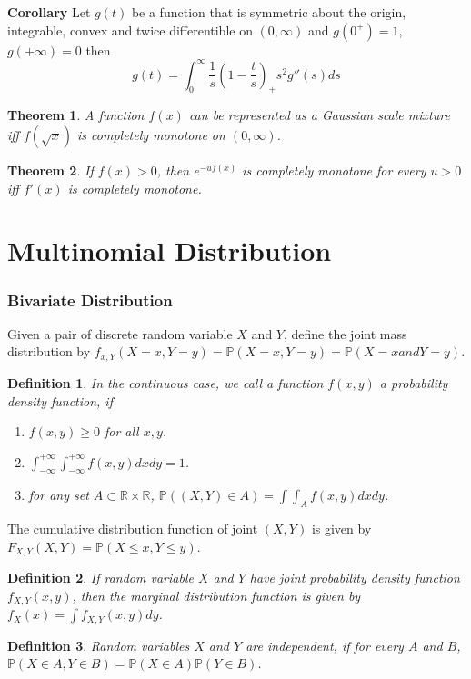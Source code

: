 \documentclass[11pt]{article}
\def\BP{{\bf P}}
\def\BR{{\mathbb R}}
\def\BP{{\mathbb P}}
\newtheorem{theorem}{Theorem}[section]
\newtheorem{definition}{Definition}[section]
\begin{document}
\textbf{Corollary}
Let $g(t)$ be a function that is symmetric about the origin, integrable, convex and twice differentible on $(0, \infty)$ and $g(0^+) = 1$, $g(+\infty) = 0$ then
\[ g(t) = \int_0^{\infty} \frac{1}{s} (1-\frac{t}{s})_+ s^2 g''(s) ds \]

\begin{theorem}
A function $f(x)$ can be represented as a Gaussian scale mixture iff $f(\sqrt{x})$ is completely monotone on $(0, \infty)$.
\end{theorem}

\begin{theorem}
If $f(x) > 0$, then $e^{-uf(x)}$ is completely monotone for every $u>0$ iff $f'(x)$ is completely monotone.
\end{theorem}

\section{Multinomial Distribution}

\subsubsection{Bivariate Distribution}
Given a pair of discrete random variable $X$ and $Y$, define the joint mass distribution by $f_{x,Y}(X=x, Y=y) = \BP(X=x, Y=y) = \BP(X=x and Y = y)$.

\begin{definition}
In the continuous case, we call a function $f(x,y)$ a probability density function, if
\begin{enumerate}
\item $f(x,y) \geq 0$ for all $x, y$.
\item $\int_{-\infty}^{+\infty}\int_{-\infty}^{+\infty} f(x,y) dxdy = 1$.
\item for any set $A \subset \BR \times \BR$, $\BP((X,Y) \in A) = \int\int_A f(x,y) dxdy$. 
\end{enumerate}
\end{definition}
The cumulative distribution function of joint $(X,Y)$ is given by $F_{X,Y} (X, Y) = \BP(X \leq x, Y \leq y)$.

\begin{definition}
If random variable $X$ and $Y$ have joint probability density function $f_{X,Y}(x, y)$, then the marginal distribution function is given by $f_X(x) = \int f_{X, Y}(x, y) dy$.
\end{definition}

\begin{definition}
Random variables $X$ and $Y$ are independent, if for every $A$ and $B$, $\BP(X\in A, Y\in B) = \BP(X\in A)\BP(Y\in B)$.
\end{definition}
\end{document}
